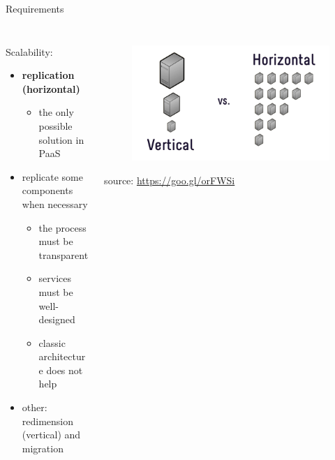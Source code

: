 \begin{frame}{Requirements}
{\begin{columns}
\begin{column}{0.4\textwidth}
\begin{figure}
				\end{figure}
			\end{column}
		\end{columns}
	}
	{
		\begin{columns}
			\begin{column}{0.65\textwidth}
				Scalability:
				\begin{itemize}
					\item{\footnotesize{\textbf{replication (horizontal)}}}
					\begin{itemize}
						\item{\scriptsize{the only possible solution in PaaS}}
					\end{itemize}
					\item{\footnotesize{replicate some components when necessary}}
					\begin{itemize}
						\item{\scriptsize{the process must be transparent}}
						\item{\scriptsize{services must be well-designed}}
						\item{\scriptsize{classic architecture does not help}}
					\end{itemize}
					\item{\footnotesize{other: redimension (vertical) and migration}}
				\end{itemize}
			\end{column}
			\begin{column}{0.35\textwidth}
				\begin{figure}
					\centering{}
					\includegraphics[scale=0.14]{images/scalability.png}
				\end{figure}
				\begin{flushright}
					\tiny{source: \url{https://goo.gl/orFWSi}}
				\end{flushright}

\end{column}
\end{columns}}
\end{frame}
